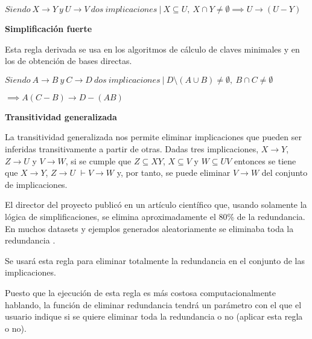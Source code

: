 \begin{center}
    \(Siendo \ X \to Y \ y \ U\to V \ dos \ implicaciones \ | \ X \subseteq U, \ X \cap Y \neq \emptyset \implies U \to (U - Y)\)
\end{center}


\bigskip

% 
\textbf{Simplificaci\'on fuerte}

Esta regla derivada se usa en los algoritmos de c\'alculo de claves minimales y en los de obtenci\'on de bases directas. 
\begin{center}
    \(Siendo \ A \to B \ y \ C\to D \ dos \ implicaciones \ | \ D \setminus (A \cup B) \neq \emptyset, \ B \cap C \neq \emptyset\)
\end{center}

\begin{center}
    \(\implies A(C-B) \to D - (AB)\)
\end{center}


\bigskip

\textbf{Transitividad generalizada}

La transitividad generalizada nos permite eliminar implicaciones que pueden ser inferidas transitivamente a partir de otras. Dadas tres implicaciones, \(X \to Y\), \(Z \to U\) y \(V \to W\), si se cumple que \(Z \subseteq XY \), \( X \subseteq V \) y \( W \subseteq UV \) entonces se tiene que  \(X \to Y\), \(Z \to U\) \( \vdash V \to W\) y, por tanto, se puede eliminar \(V \to W\) del conjunto de implicaciones.

El director del proyecto public\'o en un art\'iculo cient\'ifico que, usando solamente la l\'ogica de simplificaciones, se elimina aproximadamente el 80\% de la redundancia. En muchos datasets y ejemplos generados aleatoriamente se eliminaba toda la redundancia \cite{Mora2003}. 

Se usar\'a esta regla para eliminar totalmente la redundancia en el conjunto de las implicaciones. 

Puesto que la ejecuci\'on de esta regla es m\'as costosa computacionalmente hablando, la funci\'on de eliminar redundancia tendr\'a un par\'ametro con el que el usuario indique si se quiere eliminar toda la redundancia o no (aplicar esta regla o no).\\

\newpage

\newpage
